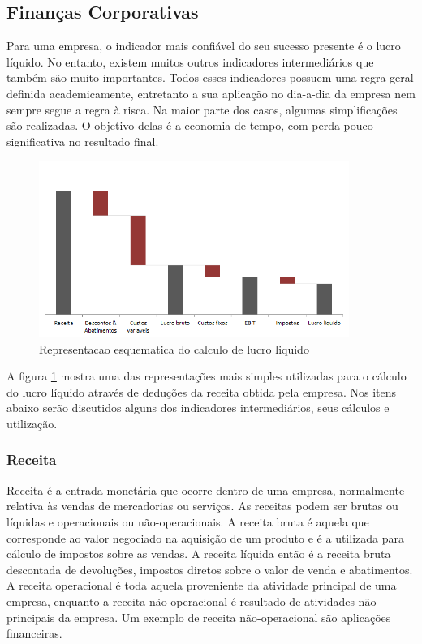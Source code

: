 \documentclass[12pt]{article}
\begin{document}
\subsection{Finanças Corporativas}

	Para uma empresa, o indicador mais confiável do seu sucesso presente é o lucro líquido. No entanto, existem muitos outros indicadores intermediários que também são muito importantes. Todos esses indicadores possuem uma regra geral definida academicamente, entretanto a sua aplicação no dia-a-dia da empresa nem sempre segue a regra à risca. Na maior parte dos casos, algumas simplificações são realizadas. O objetivo delas é a economia de tempo, com perda pouco significativa no resultado final.

\begin{figure}[h!]
	\centering
	\includegraphics[width=0.9\textwidth]{img/finance.png}
	\caption{Representacao esquematica do calculo de lucro liquido}
	\label{fig:lucro}
\end{figure}

	A figura \ref{fig:lucro} mostra uma das representações mais simples utilizadas para o cálculo do lucro líquido através de deduções da receita obtida pela empresa. Nos itens abaixo serão discutidos alguns dos indicadores intermediários, seus cálculos e utilização. 

\subsubsection{Receita}

	Receita é a entrada monetária que ocorre dentro de uma empresa, normalmente relativa às vendas de mercadorias ou serviços. As receitas podem ser brutas ou líquidas e operacionais ou não-operacionais. A receita bruta é aquela que corresponde ao valor negociado na aquisição de um produto e é a utilizada para cálculo de impostos sobre as vendas. A receita líquida então é a receita bruta descontada de devoluções, impostos diretos sobre o valor de venda e abatimentos.
A receita operacional é toda aquela proveniente da atividade principal de uma empresa, enquanto a receita não-operacional é resultado de atividades não principais da empresa. Um exemplo de receita não-operacional são aplicações financeiras.
\end{document}
